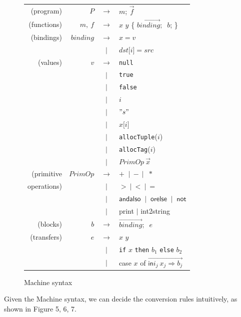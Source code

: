 \documentclass{article}
\theoremstyle{definition}
\theoremstyle{remark}
\numberwithin{equation}{section}
\begin{document}
\begin{figure}[!ht]
  \centering
\begin{tabular}{rrcl}
(program) & $P$ & $\to$ & $m$; $\vec{f}$ \\

(functions) & $m,\ f$ & $\to$ & $x$ $y$ \{
      $\overrightarrow{binding};$  $\ b$; \}\\

(bindings) & $binding$ & $\to$ & $x=v$ \\
        &     & $|$ & $dst\texttt{[}i\texttt{]}=src$\\

(values) & $v$ & $\to$ & \texttt{null} \\
        &     & $|$ & \texttt{true}\\
        &     & $|$ & \texttt{false}\\
        &     & $|$ & $i$\\
        &     & $|$ & $"s"$\\
        &     & $|$ & $x\texttt{[}i\texttt{]}$\\
        &     & $|$ & \texttt{allocTuple}($i$)\\
        &     & $|$ & \texttt{allocTag}($i$)\\
        &     & $|$ &  $PrimOp\ \vec{x}$\\

(primitive & $PrimOp$ & $\to$ & $+\ $ $|\ -\ |$ $\ *$\\
operations) &     & $|$ & $>\ |\ <\ |\ =$\\
        &     & $|$ & $\textsf{andalso }\ |\ \textsf{ orelse }\ |\ \textsf{ not}$\\
        &     & $|$ & \textsf{print} $|$ \textsf{int2string}\\

(blocks) & $b$ & $\to$ &  $\overrightarrow{binding};$  $\ e$\\

(transfers) & $e$ & $\to$ &  $x$ $y$\\
        &     & $|$ & \texttt{if} $x$ \texttt{then} $b_1$ \texttt{else} $b_2$\\
        &     & $|$ & \textsf{case} $x$ \textsf{of}
         $\overrightarrow{\textsf{in}i_j\ x_j \Rightarrow b_j}$\\
\end{tabular}
  \caption{Machine syntax}
  \label{fig-sub}
\end{figure}

Given the Machine syntax, we can decide the conversion rules intuitively, as
shown in Figure 5, 6, 7.
\end{document}
